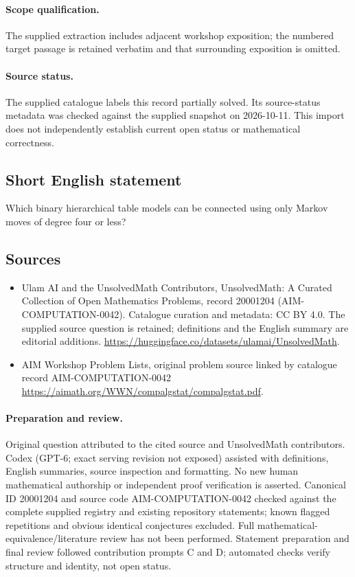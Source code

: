 \documentclass[11pt]{article}
\begin{document}
\paragraph{Scope qualification.}
The supplied extraction includes adjacent workshop exposition; the numbered target passage is retained verbatim and that surrounding exposition is omitted.
\paragraph{Source status.}
The supplied catalogue labels this record partially solved. Its source-status metadata was checked against the supplied snapshot on 2026-10-11. This import does not independently establish current open status or mathematical correctness.
\subsection{Short English statement}
Which binary hierarchical table models can be connected using only Markov moves of degree four or less?
\subsection{Sources}
\begin{itemize}
\item[S1] Ulam AI and the UnsolvedMath Contributors, UnsolvedMath: A Curated Collection of Open Mathematics Problems, record 20001204 (AIM-COMPUTATION-0042). Catalogue curation and metadata: CC BY 4.0. The supplied source question is retained; definitions and the English summary are editorial additions.
\url{https://huggingface.co/datasets/ulamai/UnsolvedMath}.
\item[S2] AIM Workshop Problem Lists, original problem source linked by catalogue record AIM-COMPUTATION-0042
\url{https://aimath.org/WWN/compalgstat/compalgstat.pdf}.
\end{itemize}
\paragraph{Preparation and review.}
Original question attributed to the cited source and UnsolvedMath contributors. Codex (GPT-6; exact serving revision not exposed) assisted with definitions, English summaries, source inspection and formatting. No new human mathematical authorship or independent proof verification is asserted. Canonical ID 20001204 and source code AIM-COMPUTATION-0042 checked against the complete supplied registry and existing repository statements; known flagged repetitions and obvious identical conjectures excluded. Full mathematical-equivalence/literature review has not been performed. Statement preparation and final review followed contribution prompts C and D; automated checks verify structure and identity, not open status.
\label{end:20001204}
\end{document}
